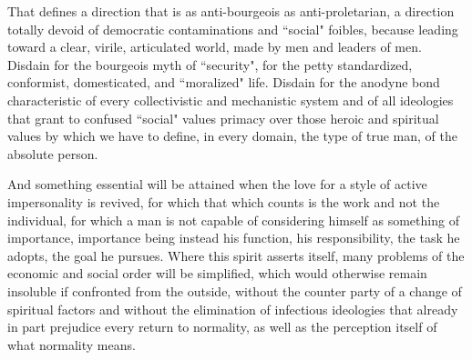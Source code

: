 That defines a direction that is as anti-bourgeois as anti-proletarian, a direction totally devoid of democratic contaminations and ``social" foibles, because leading toward a clear, virile, articulated world, made by men and leaders of men. Disdain for the bourgeois myth of ``security", for the petty standardized, conformist, domesticated, and ``moralized" life. Disdain for the anodyne bond characteristic of every collectivistic and mechanistic system and of all ideologies that grant to confused ``social" values primacy over those heroic and spiritual values by which we have to define, in every domain, the type of true man, of the absolute person.

And something essential will be attained when the love for a style of active impersonality is revived, for which that which counts is the work and not the individual, for which a man is not capable of considering himself as something of importance, importance being instead his function, his responsibility, the task he adopts, the goal he pursues. Where this spirit asserts itself, many problems of the economic and social order will be simplified, which would otherwise remain insoluble if confronted from the outside, without the counter party of a change of spiritual factors and without the elimination of infectious ideologies that already in part prejudice every return to normality, as well as the perception itself of what normality means.

